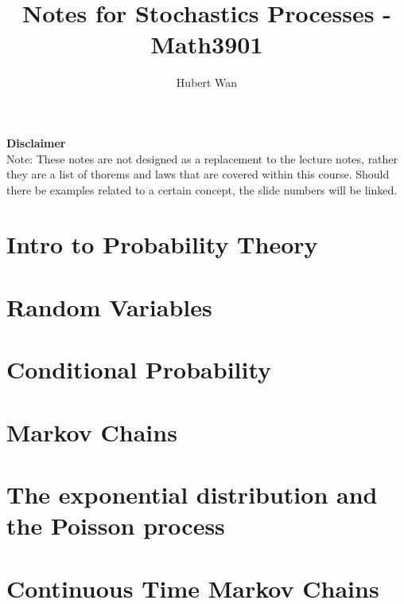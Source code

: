 \documentclass[10pt]{article}
\begin{document}
\title{Notes for Stochastics Processes - Math3901}
\author{Hubert Wan}
\maketitle
\textbf{Disclaimer}\\
Note: These notes are not designed as a replacement to the lecture notes, rather they are a list of thorems and laws that are covered within this course. Should there be examples related to a certain concept, the slide numbers will be linked.
\newpage

\section{Intro to Probability Theory}


\newpage

\section{Random Variables}


\newpage

\section{Conditional Probability}


\newpage

\section{Markov Chains}


\newpage
\section{The exponential distribution and the Poisson process}


\newpage
\section{Continuous Time Markov Chains}

\end{document}
